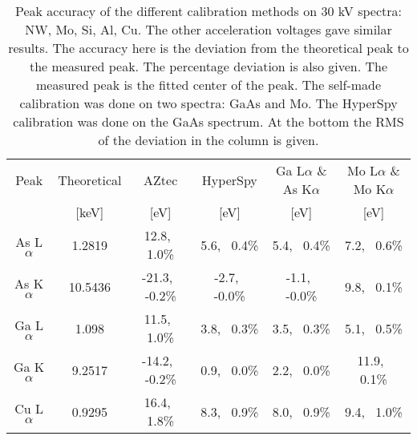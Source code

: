 
\begin{table}[p]
    \centering
    \caption{
        Peak accuracy of the different calibration methods on 30 kV spectra: NW, Mo, Si, Al, Cu. %
        The other acceleration voltages gave similar results.
        The accuracy here is the deviation from the theoretical peak to the measured peak.
        The percentage deviation is also given.
        The measured peak is the fitted center of the peak.
        The self-made calibration was done on two spectra: GaAs and Mo. %
        The HyperSpy calibration was done on the GaAs spectrum.
        At the bottom the RMS of the deviation in the column is given.
    }
    \label{tab:results:calibration-peak-accuracy}
    \begin{tabular}{cccccc}
        Peak         & Theoretical & AZtec                 & HyperSpy              & Ga L$\alpha$ \& As K$\alpha$ & Mo L$\alpha$ \& Mo K$\alpha$ \\
                     & [keV]       & [eV]                  & [eV]                  & [eV]                         & [eV]                         \\
        \hline
        As L$\alpha$ & 1.2819      & 12.8,\,\,\,    1.0\%  & 5.6,\,\,\,    0.4\%   & 5.4,\,\,\,    0.4\%          & 7.2,\,\,\,    0.6\%          \\
        As K$\alpha$ & 10.5436     & -21.3,\,\,\,   -0.2\% & -2.7,\,\,\,   -0.0\%  & -1.1,\,\,\,   -0.0\%         & 9.8,\,\,\,    0.1\%          \\
        Ga L$\alpha$ & 1.098       & 11.5,\,\,\,    1.0\%  & 3.8,\,\,\,    0.3\%   & 3.5,\,\,\,    0.3\%          & 5.1,\,\,\,    0.5\%          \\
        Ga K$\alpha$ & 9.2517      & -14.2,\,\,\,   -0.2\% & 0.9,\,\,\,    0.0\%   & 2.2,\,\,\,    0.0\%          & 11.9,\,\,\,    0.1\%         \\
        Cu L$\alpha$ & 0.9295      & 16.4,\,\,\,    1.8\%  & 8.3,\,\,\,    0.9\%   & 8.0,\,\,\,    0.9\%          & 9.4,\,\,\,    1.0\%          \\

\end{tabular}
\end{table}

